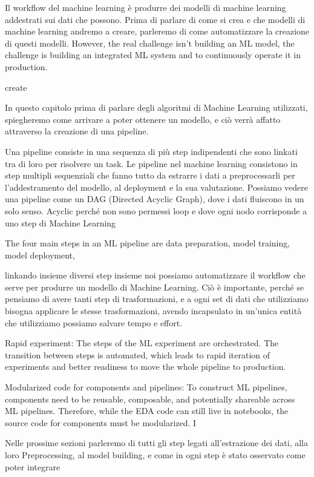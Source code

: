 \label{chap:machine_learning}


Il workflow del machine learning è produrre dei modelli di machine learning
addestrati sui dati che possono. Prima di parlare di come si crea e che
modelli di machine learning andremo a creare, parleremo di come automatizzare
la creazione di questi modelli. 
However, the real challenge isn't building an ML model, the
challenge is building an integrated ML system and to continuously operate it
in production.

create

In questo capitolo prima di parlare degli algoritmi di Machine Learning utilizzati,
spiegheremo come arrivare a poter ottenere un modello, e ciò verrà affatto
attraverso la creazione di una pipeline.

Una pipeline consiste in una sequenza di più step indipendenti che sono
linkati tra di loro per risolvere un task. Le pipeline nel machine learning
consistono in step multipli sequenziali che fanno tutto da estrarre i dati a
preprocessarli per l'addestramento del modello, al deployment e la sua
valutazione. Possiamo vedere una pipeline come un DAG (Directed Acyclic
Graph), dove i dati fluiscono in un solo senso. Acyclic perché non sono
permessi loop e dove ogni nodo corrisponde a uno step di Machine Learning

The four main steps in an ML pipeline are data preparation, model training, model deployment,

linkando insieme diversi step insieme noi possiamo automatizzare il workflow
che serve per produrre un modello di Machine Learning. Ciò è importante,
perché se pensiamo di avere tanti step di trasformazioni, e a ogni set di dati
che utilizziamo bisogna applicare le stesse trasformazioni, avendo incapsulato
in un'unica entità che utilizziamo possiamo salvare tempo e effort.

Rapid experiment: The steps of the ML experiment are orchestrated. The
transition between steps is automated, which leads to rapid iteration of
experiments and better readiness to move the whole pipeline to production.

Modularized code for components and pipelines: To construct ML pipelines,
components need to be reusable, composable, and potentially shareable across
ML pipelines. Therefore, while the EDA code can still live in notebooks, the
source code for components must be modularized. I

Nelle prossime sezioni parleremo di tutti gli step legati all'estrazione dei
dati, alla loro Preprocessing, al model building, e come in ogni step è stato
osservato come poter integrare 

